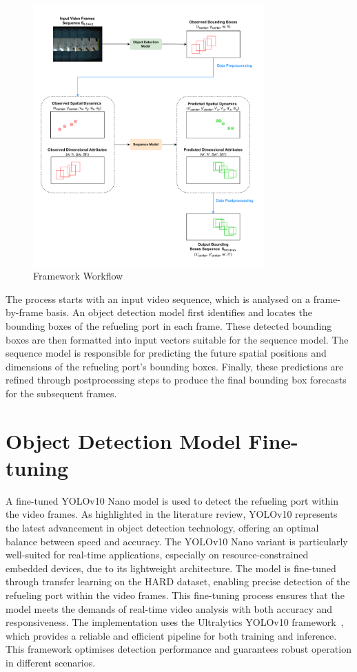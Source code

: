 \documentclass[12pt,oneside]{book} %
\begin{document}
\begin{figure}[H]
    \centering
    \includegraphics[width=0.79\textwidth]{figures/FrameworkWorkflow.drawio.pdf}
    \caption{Framework Workflow}\label{fig:framework-workflow}
\end{figure}

The process starts with an input video sequence, which is analysed on a
frame-by-frame basis. An object detection model first identifies and locates
the bounding boxes of the refueling port in each frame. These detected bounding
boxes are then formatted into input vectors suitable for the sequence model.
The sequence model is responsible for predicting the future spatial positions
and dimensions of the refueling port’s bounding boxes. Finally, these
predictions are refined through postprocessing steps to produce the final
bounding box forecasts for the subsequent frames.

\section{Object Detection Model Fine-tuning}
A fine-tuned YOLOv10 Nano model is used to detect the refueling port within the
video frames. As highlighted in the literature review, YOLOv10 represents the
latest advancement in object detection technology, offering an optimal balance
between speed and accuracy. The YOLOv10 Nano variant is particularly
well-suited for real-time applications, especially on resource-constrained
embedded devices, due to its lightweight architecture. The model is fine-tuned
through transfer learning on the HARD dataset, enabling precise detection of
the refueling port within the video frames. This fine-tuning process ensures
that the model meets the demands of real-time video analysis with both accuracy
and responsiveness. The implementation uses the Ultralytics YOLOv10
framework~\cite{Jocher_Ultralytics_YOLO_2023}, which provides a reliable and
efficient pipeline for both training and inference. This framework optimises
detection performance and guarantees robust operation in different scenarios.
\end{document}
